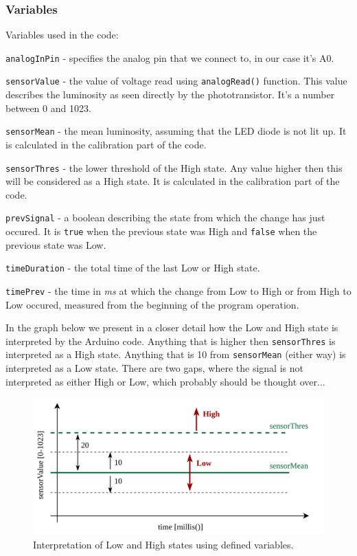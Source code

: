 \documentclass[12pt]{report}
\begin{document}
\subsubsection{Variables}

Variables used in the code:

\verb|analogInPin| - specifies the analog pin that we connect to, in our case it's A0.

\verb|sensorValue| - the value of voltage read using \verb|analogRead()| function. This value describes the luminosity as seen directly by the phototransistor. It's a number between 0 and 1023.

\verb|sensorMean| - the mean luminosity, assuming that the LED diode is not lit up. It is calculated in the calibration part of the code.

\verb|sensorThres| - the lower threshold of the High state. Any value higher then this will be considered as a High state. It is calculated in the calibration part of the code.

\verb|prevSignal| - a boolean describing the state from which the change has just occured. It is \verb|true| when the previous state was High and \verb|false| when the previous state was Low.

\verb|timeDuration| - the total time of the last Low or High state.

\verb|timePrev| - the time in \textit{ms} at which the change from Low to High or from High to Low occured, measured from the beginning of the program operation.

In the graph below we present in a closer detail how the Low and High state is interpreted by the Arduino code. Anything that is higher then \verb|sensorThres| is interpreted as a High state. Anything that is 10 from \verb|sensorMean| (either way) is interpreted as a Low state. There are two gaps, where the signal is not interpreted as either High or Low, which probably should be thought over...

\begin{figure}[H]
\centering\includegraphics[scale=0.18]{arduinocode}
\caption{Interpretation of Low and High states using defined variables.}				
\label{fig:arduino_code}
\end{figure}
\end{document}
